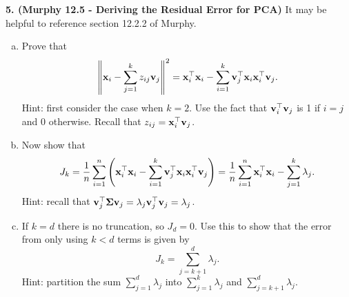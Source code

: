 \documentclass[12pt,letterpaper,fleqn]{hmcpset}
\begin{document}
\textbf{5. (Murphy 12.5 - Deriving the Residual Error for PCA)} It may be helpful to reference
section 12.2.2 of Murphy.
\begin{enumerate}[(a)]
    \item Prove that
        \[
            \left\|{\bf x}_i - \sum_{j=1}^k z_{ij}{\bf v}_j\right\|^2 = {\bf x}_i^\top{\bf x}_i - \sum_{i=1}^k{\bf v}_j^\top {\bf x}_i{\bf x}_i^\top {\bf v}_j.
        \]
        Hint: first consider the case when $k=2$. Use the fact that ${\bf v}_i^\top{\bf v}_j$ is 1 if $i=j$ and 0 otherwise.
        Recall that $z_{ij} = {\bf x}_i^\top{\bf v}_j$.

    \item Now show that
        \[
            J_k = \frac{1}{n}\sum_{i=1}^n \left({\bf x}_i^\top {\bf x}_i - \sum_{i=1}^k{\bf v}_j^\top {\bf x}_i{\bf x}_i^\top {\bf v}_j\right) = \frac{1}{n}\sum_{i=1}^n {\bf x}_i^\top{\bf x}_i - \sum_{j=1}^k\lambda_j.
        \]
        Hint: recall that ${\bf v}_j^\top \hbox{\boldmath$\Sigma$} {\bf v}_j = \lambda_j{\bf v}_j^\top{\bf v}_j = \lambda_j$.

    \item If $k=d$ there is no truncation, so $J_d=0$. Use this to show that the error from only using $k<d$
        terms is given by
        \[
            J_k = \sum_{j=k+1}^d \lambda_j.
        \]
        Hint: partition the sum $\sum_{j=1}^d \lambda_j$ into $\sum_{j=1}^k \lambda_j$ and $\sum_{j=k+1}^d \lambda_j$.
\end{enumerate}
\end{document}
